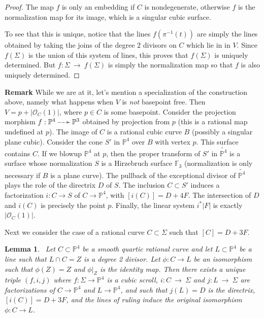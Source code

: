 \documentclass[twoside,12pt,reqno]{amsart}
\theoremstyle{plain}
\newtheorem{lem}[thm]{Lemma}
\theoremstyle{definition}
\newcommand{\FF}{\mathbb{F}}
\newcommand{\PP}{\mathbb{P}}
\def\ps{\vspace{4pt}}
\newcommand{\OO}{\mathcal O}
\newcommand{\rarrowtip}{{\scriptscriptstyle -\mkern -10mu \mbox{$\scriptscriptstyle\succ$}}}
\newcommand{\dottedrightarrow}{\mathbin{\raisebox{0.30ex}{\mbox{\boldmath$\scriptscriptstyle -\mkern -1mu -\mkern -1mu \rarrowtip$}}}}
\begin{document}
\begin{proof}
\ps

The map $f$ is only an embedding if $C$ is nondegenerate,
otherwise $f$ is the normalization map for its image, which is a singular 
cubic surface.

\ps

To see that this is unique, notice that the lines $f(\pi^{-1}(t))$ are simply
the lines obtained by taking the joins of the degree $2$ divisors on
$C$ which lie in in $V$.  Since $f(\Sigma)$ is the union of this system
of lines, this proves that $f(\Sigma)$ is uniquely determined.  But
$f:\Sigma~\rightarrow~ f(\Sigma)$ is simply the normalization map so that
$f$ is also uniquely determined.
\end{proof}

\textbf{Remark}
While we are at it, let's mention a specialization of the construction
above, namely what happens when $V$ is {\em not} basepoint free.
Then $V=p+|\OO_C(1)|$, where $p\in C$ is some basepoint.  Consider
the projection morphism $f:\PP^4\dottedrightarrow \PP^3$ obtained by
projection from $p$ (this is a rational map undefined at $p$).  The
image of $C$ is a rational cubic curve $B$ (possibly a singular plane
cubic).  Consider the cone $S'$ in $\PP^4$ over $B$ with vertex
$p$.  This 
surface contains $C$.  If we blowup $\PP^4$ at $p$, then the proper
transform of $S'$ in $\widetilde{\PP^4}$ is a surface whose
normalization $S$ is a 
Hirzebruch surface $\FF_3$ (normalization is only necessary if
$B$ is a plane curve).  The pullback of the exceptional divisor of 
$\widetilde{\PP^4}$ plays the role of the directrix $D$ of $S$.  The inclusion
$C\subset S'$ induces a factorization $i:C\rightarrow S$ of
$C\rightarrow \PP^4$, with $[i(C)] = D + 4F$.  The intersection of $D$
and $i(C)$ is precisely the point $p$.  Finally, the linear system $i^*|F|$
is exactly $|\OO_C(1)|$.  

\ps

Next we consider the case of a rational curve $C\subset \Sigma$ such
that $[C]=D+3F$.  

\ps

\begin{lem}~\label{lem-scr40}  
Let $C\subset \PP^4$ be a smooth quartic rational curve 
and let $L\subset \PP^4$ be a line such that $L\cap C=Z$ is a degree 2
divisor.  
Let $\phi:C\rightarrow L$ be an isomorphism such that $\phi(Z)=Z$ and
$\phi|_Z$ is the identity map.  Then there exists a unique triple
$(f,i,j)$ where $f:\Sigma\rightarrow \PP^4$ is a cubic scroll,
$i:C~\rightarrow~\Sigma$ and $j:L~\rightarrow~\Sigma$ are factorizations of
$C\rightarrow \PP^4$ and $L\rightarrow \PP^4$, and 
such that $j(L)=D$ is the directrix, $[i(C)]=D+3F$, and 
the lines of ruling induce the original isomorphism $\phi:C\rightarrow L$.
\end{lem}
\end{document}
